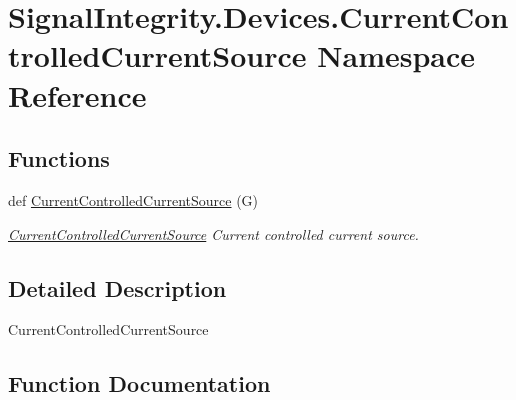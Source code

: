 \hypertarget{namespaceSignalIntegrity_1_1Devices_1_1CurrentControlledCurrentSource}{}\section{Signal\+Integrity.\+Devices.\+Current\+Controlled\+Current\+Source Namespace Reference}
\label{namespaceSignalIntegrity_1_1Devices_1_1CurrentControlledCurrentSource}
\subsection*{Functions}
\begin{DoxyCompactItemize}
\item 
def \hyperlink{namespaceSignalIntegrity_1_1Devices_1_1CurrentControlledCurrentSource_a385d9a2695347779ae6b849b6228f59e}{Current\+Controlled\+Current\+Source} (G)
\begin{DoxyCompactList}\small\item\em \hyperlink{namespaceSignalIntegrity_1_1Devices_1_1CurrentControlledCurrentSource}{Current\+Controlled\+Current\+Source} Current controlled current source. \end{DoxyCompactList}\end{DoxyCompactItemize}


\subsection{Detailed Description}
\begin{DoxyVerb}CurrentControlledCurrentSource\end{DoxyVerb}
 

\subsection{Function Documentation}
\mbox{\label{namespaceSignalIntegrity_1_1Devices_1_1CurrentControlledCurrentSource_a385d9a2695347779ae6b849b6228f59e}} 
